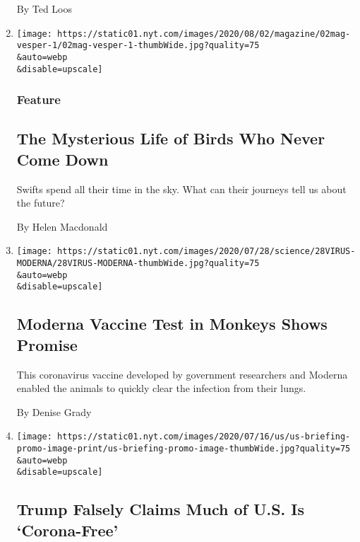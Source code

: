 \begin{enumerate}
  By Ted Loos
\item
  \href{/2020/07/29/magazine/vesper-flights.html}{}

  \texttt{[image: https://static01.nyt.com/images/2020/08/02/magazine/02mag-vesper-1/02mag-vesper-1-thumbWide.jpg?quality=75\\\&auto=webp\\\&disable=upscale]}

  \hypertarget{feature}{%
  \subsubsection{Feature}\label{feature}}

  \hypertarget{the-mysterious-life-of-birds-who-never-come-down}{%
  \subsection{The Mysterious Life of Birds Who Never Come
  Down}\label{the-mysterious-life-of-birds-who-never-come-down}}

  Swifts spend all their time in the sky. What can their journeys tell
  us about the future?

  By Helen Macdonald
\item
  \href{/2020/07/28/health/coronavirus-moderna-vaccine-monkeys.html}{}

  \texttt{[image: https://static01.nyt.com/images/2020/07/28/science/28VIRUS-MODERNA/28VIRUS-MODERNA-thumbWide.jpg?quality=75\\\&auto=webp\\\&disable=upscale]}

  \hypertarget{moderna-vaccine-test-in-monkeys-shows-promise}{%
  \subsection{Moderna Vaccine Test in Monkeys Shows
  Promise}\label{moderna-vaccine-test-in-monkeys-shows-promise}}

  This coronavirus vaccine developed by government researchers and
  Moderna enabled the animals to quickly clear the infection from their
  lungs.

  By Denise Grady
\item
  \href{/2020/07/28/world/coronavirus-covid-19.html}{}

  \texttt{[image: https://static01.nyt.com/images/2020/07/16/us/us-briefing-promo-image-print/us-briefing-promo-image-thumbWide.jpg?quality=75\\\&auto=webp\\\&disable=upscale]}

  \hypertarget{trump-falsely-claims-much-of-us-is-corona-free}{%
  \subsection{Trump Falsely Claims Much of U.S. Is
  `Corona-Free'}\label{trump-falsely-claims-much-of-us-is-corona-free}}


\end{enumerate}
